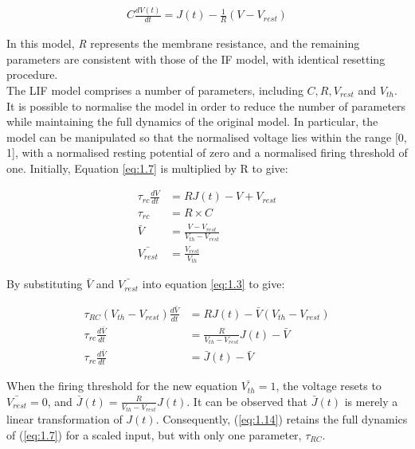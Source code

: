 \begin{align}
C \frac{dV(t)}{dt} = J(t) - \frac{1}{R} (V - V_{rest}) \label{eq:1.7} 
\end{align}

\noindent In this model, \textit{R} represents the membrane resistance, and the remaining parameters are consistent with those of the IF model, with identical resetting procedure.\\

\noindent The LIF model comprises a number of parameters, including $C, R, V_{rest}$ and $V_{th}$. It is possible to normalise the model in order to reduce the number of parameters while maintaining the full dynamics of the original model. In particular, the model can be manipulated so that the normalised voltage lies within the range [0, 1], with a normalised resting potential of zero and a normalised firing threshold of one. Initially, Equation \ref{eq:1.7} is multiplied by R to give:

\begin{align}
    \tau_{rc} \frac{dV}{dt} &= RJ(t) - V + V_{rest} \label{eq:1.8} \\
    \tau_{rc} &= R \times C \label{eq:1.9} \\
    \bar{V} &= \frac{V - V_{rest}}{V_{th} - V_{rest}} \label{eq:1.10} \\
    \bar{V_{rest}} &= \frac{V_{rest}}{V_{th}} \label{eq:1.11} 
\end{align}

\noindent By substituting $\bar{V}$ and $\bar{V_{rest}}$ into equation \ref{eq:1.3} to give:


\begin{align}
    \tau_{RC}(V_{th} - V_{rest})\frac{d\bar{V}}{dt} &= RJ(t) - \bar{V}(V_{th} - V_{rest})
    \label{eq:1.12} \\
    \tau_{rc}\frac{d\bar{V}}{dt} &= \frac{R}{V_{th} - V_{rest}} J(t) - \bar{V} \label{eq:1.13} \\
    \tau_{rc} \frac{d\bar{V}}{dt} &= \bar{J}(t) - \bar{V} \label{eq:1.14} 
\end{align}

\noindent When the firing threshold for the new equation $\bar{V_{th}} = 1$, the voltage resets to $\bar{V_{rest}} = 0$, and $\bar{J}(t) = \frac{R}{V_{th} - V_{rest}} J(t)$. It can be observed that $\bar{J}(t)$ is merely a linear transformation of $J(t)$. Consequently, (\ref{eq:1.14}) retains the full dynamics of (\ref{eq:1.7}) for a scaled input, but with only one parameter, $\tau_{RC}$. \\

